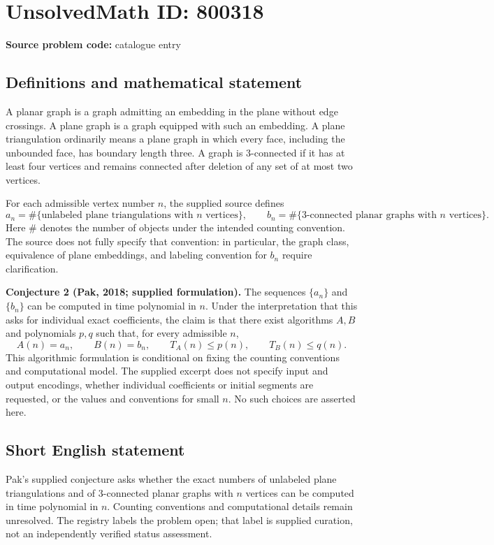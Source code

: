 \documentclass[11pt]{article}
\begin{document}
\section*{UnsolvedMath ID: 800318}
\textbf{Source problem code:} catalogue entry
\subsection{Definitions and mathematical statement}
A planar graph is a graph admitting an embedding in the plane without edge crossings. A plane graph is a graph equipped with such an embedding. A plane triangulation ordinarily means a plane graph in which every face, including the unbounded face, has boundary length three. A graph is \(3\)-connected if it has at least four vertices and remains connected after deletion of any set of at most two vertices.

For each admissible vertex number \(n\), the supplied source defines
\[
a_n=\#\{\text{unlabeled plane triangulations with }n\text{ vertices}\},
\qquad
b_n=\#\{\text{\(3\)-connected planar graphs with }n\text{ vertices}\}.
\]
Here \(\#\) denotes the number of objects under the intended counting convention. The source does not fully specify that convention: in particular, the graph class, equivalence of plane embeddings, and labeling convention for \(b_n\) require clarification.

\textbf{Conjecture 2 (Pak, 2018; supplied formulation).} The sequences \(\{a_n\}\) and \(\{b_n\}\) can be computed in time polynomial in \(n\). Under the interpretation that this asks for individual exact coefficients, the claim is that there exist algorithms \(A,B\) and polynomials \(p,q\) such that, for every admissible \(n\),
\[
A(n)=a_n,\qquad B(n)=b_n,\qquad
T_A(n)\le p(n),\qquad T_B(n)\le q(n).
\]
This algorithmic formulation is conditional on fixing the counting conventions and computational model. The supplied excerpt does not specify input and output encodings, whether individual coefficients or initial segments are requested, or the values and conventions for small \(n\). No such choices are asserted here.
\subsection{Short English statement}
Pak's supplied conjecture asks whether the exact numbers of unlabeled plane triangulations and of \(3\)-connected planar graphs with \(n\) vertices can be computed in time polynomial in \(n\). Counting conventions and computational details remain unresolved. The registry labels the problem open; that label is supplied curation, not an independently verified status assessment.
\end{document}

